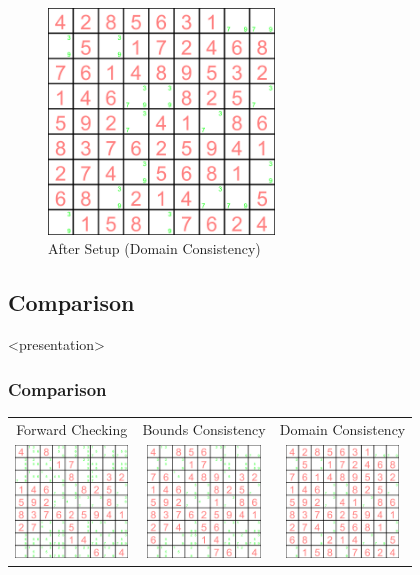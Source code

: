 \begin{figure}[ht]
\caption{\label{sudoku:aftersetupdc}After Setup (Domain Consistency)}
\begin{center}
\includegraphics[width=6cm]{../sudoku/DC/frame29}
\end{center}
\end{figure}


\subsection{Comparison}

\begin{frame}<presentation>
\frametitle{Comparison}
\begin{tabular}{ccc}
Forward Checking & Bounds Consistency & Domain Consistency \\
\includegraphics[width=3cm]{../sudoku/FC/frame29}
&
\includegraphics[width=3cm]{../sudoku/BC/frame29}
&
\includegraphics[width=3cm]{../sudoku/DC/frame29}
\end{tabular}
\end{frame}

